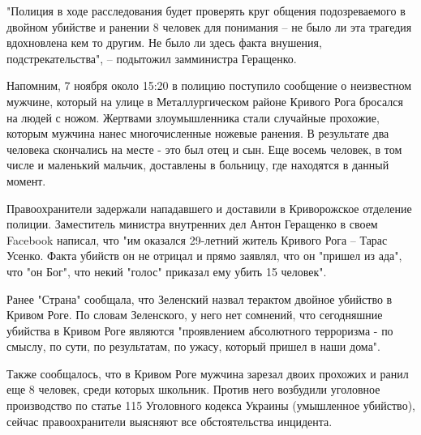 "Полиция в ходе расследования будет проверять круг общения подозреваемого в
двойном убийстве и ранении 8 человек для понимания – не было ли эта трагедия
вдохновлена кем то другим. Не было ли здесь факта внушения, подстрекательства",
– подытожил замминистра Геращенко.

Напомним, 7 ноября около 15:20 в полицию поступило сообщение о неизвестном
мужчине, который на улице в Металлургическом районе Кривого Рога бросался на
людей с ножом. Жертвами злоумышленника стали случайные прохожие, которым
мужчина нанес многочисленные ножевые ранения. В результате два человека
скончались на месте - это был отец и сын. Еще восемь человек, в том числе и
маленький мальчик, доставлены в больницу, где находятся в данный момент.

Правоохранители задержали нападавшего и доставили в Криворожское отделение
полиции. Заместитель министра внутренних дел Антон Геращенко в своем Facebook
написал, что "им оказался 29-летний житель Кривого Рога – Тарас Усенко. Факта
убийств он не отрицал и прямо заявлял, что он "пришел из ада", что "он Бог",
что некий "голос" приказал ему убить 15 человек".

Ранее "Страна" сообщала, что Зеленский назвал терактом двойное убийство в
Кривом Роге. По словам Зеленского, у него нет сомнений, что сегодняшние
убийства в Кривом Роге являются "проявлением абсолютного терроризма - по
смыслу, по сути, по результатам, по ужасу, который пришел в наши дома".

Также сообщалось, что в Кривом Роге мужчина зарезал двоих прохожих и ранил еще
8 человек, среди которых школьник. Против него возбудили уголовное производство
по статье 115 Уголовного кодекса Украины (умышленное убийство), сейчас
правоохранители выясняют все обстоятельства инцидента.
